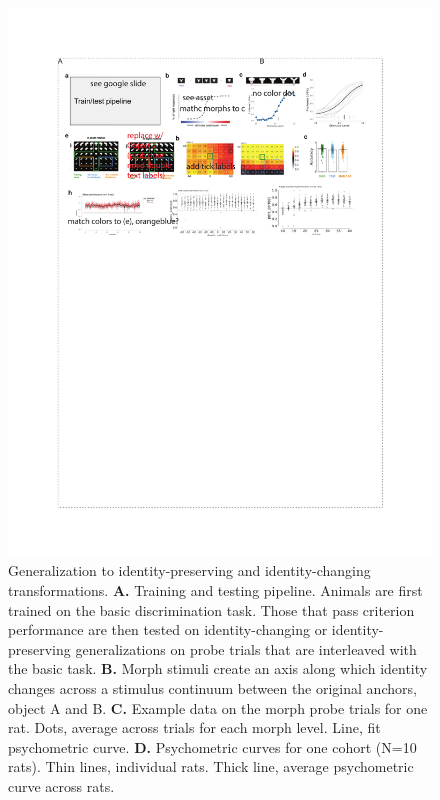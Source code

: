 \begin{figure}[t!]
\includegraphics[width=\textwidth]{figures/chapter_1/fig_1-3_behavior_generalization/fig_1-3_behavior_generalization.pdf}
    \vspace{.1in}
    \caption[Generalization of visual behavior]{Generalization to identity-preserving and identity-changing transformations. 
    \textbf{A.} Training and testing pipeline. Animals are first trained on the basic discrimination task. Those that pass criterion performance are then tested on identity-changing or identity-preserving generalizations on probe trials that are interleaved with the basic task. 
    \textbf{B.} Morph stimuli create an axis along which identity changes across a stimulus continuum between the original anchors, object A and B. 
    \textbf{C.} Example data on the morph probe trials for one rat. Dots, average across trials for each morph level. Line, fit psychometric curve. 
    \textbf{D.} Psychometric curves for one cohort (N=10 rats). Thin lines, individual rats. Thick line, average psychometric curve across rats. 
}
\end{figure}
